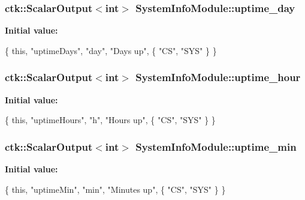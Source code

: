 \subsubsection[{\texorpdfstring{uptime\+\_\+day}{uptime_day}}]{\setlength{\rightskip}{0pt plus 5cm}ctk\+::\+Scalar\+Output$<$int$>$ System\+Info\+Module\+::uptime\+\_\+day}\hypertarget{classSystemInfoModule_ab3f0b6c63b7836c5775713c551a51ec3}{}\label{classSystemInfoModule_ab3f0b6c63b7836c5775713c551a51ec3}
{\bfseries Initial value\+:}
\begin{DoxyCode}
\{ \textcolor{keyword}{this}, \textcolor{stringliteral}{"uptimeDays"}, \textcolor{stringliteral}{"day"}, \textcolor{stringliteral}{"Days up"},
    \{ \textcolor{stringliteral}{"CS"}, \textcolor{stringliteral}{"SYS"} \} \}
\end{DoxyCode}
\subsubsection[{\texorpdfstring{uptime\+\_\+hour}{uptime_hour}}]{\setlength{\rightskip}{0pt plus 5cm}ctk\+::\+Scalar\+Output$<$int$>$ System\+Info\+Module\+::uptime\+\_\+hour}\hypertarget{classSystemInfoModule_a86c24e2c6715718cdcd5cb3596217f51}{}\label{classSystemInfoModule_a86c24e2c6715718cdcd5cb3596217f51}
{\bfseries Initial value\+:}
\begin{DoxyCode}
\{ \textcolor{keyword}{this}, \textcolor{stringliteral}{"uptimeHours"}, \textcolor{stringliteral}{"h"}, \textcolor{stringliteral}{"Hours up"},
    \{ \textcolor{stringliteral}{"CS"}, \textcolor{stringliteral}{"SYS"} \} \}
\end{DoxyCode}
\subsubsection[{\texorpdfstring{uptime\+\_\+min}{uptime_min}}]{\setlength{\rightskip}{0pt plus 5cm}ctk\+::\+Scalar\+Output$<$int$>$ System\+Info\+Module\+::uptime\+\_\+min}\hypertarget{classSystemInfoModule_a04d9e19050ba392140edc607cb2db40e}{}\label{classSystemInfoModule_a04d9e19050ba392140edc607cb2db40e}
{\bfseries Initial value\+:}
\begin{DoxyCode}
\{ \textcolor{keyword}{this}, \textcolor{stringliteral}{"uptimeMin"}, \textcolor{stringliteral}{"min"}, \textcolor{stringliteral}{"Minutes up"},
    \{ \textcolor{stringliteral}{"CS"}, \textcolor{stringliteral}{"SYS"} \} \}
\end{DoxyCode}
